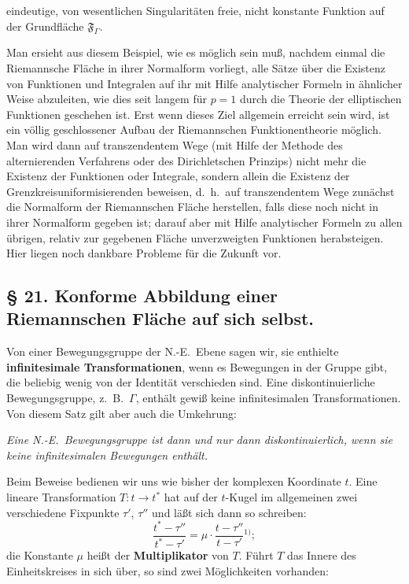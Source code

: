 \documentclass{article}
\begin{document}
eindeutige, von wesentlichen Singularitäten freie, nicht konstante Funktion auf der Grundfläche $\mathfrak{F}_\varGamma$.

Man ersieht aus diesem Beispiel, wie es möglich sein muß, nachdem einmal die Riemannsche Fläche in ihrer Normalform vorliegt, alle Sätze über die Existenz von Funktionen und Integralen auf ihr mit Hilfe analytischer Formeln in ähnlicher Weise abzuleiten, wie dies seit langem für $p = 1$ durch die Theorie der elliptischen Funktionen geschehen ist. Erst wenn dieses Ziel allgemein erreicht sein wird, ist ein völlig geschlossener Aufbau der Riemannschen Funktionentheorie möglich. Man wird dann auf transzendentem Wege (mit Hilfe der Methode des alternierenden Verfahrens oder des Dirichletschen Prinzips) nicht mehr die Existenz der Funktionen oder Integrale, sondern allein die Existenz der Grenzkreisuniformisierenden beweisen, d.~h.\ auf transzendentem Wege zunächst die Normalform der Riemannschen Fläche herstellen, falls diese noch nicht in ihrer Normalform gegeben ist; darauf aber mit Hilfe analytischer Formeln zu allen übrigen, relativ zur gegebenen Fläche unverzweigten Funktionen herabsteigen. Hier liegen noch dankbare Probleme für die Zukunft vor.

\subsection*{§ 21. Konforme Abbildung einer Riemannschen Fläche auf sich selbst.}

Von einer Bewegungsgruppe der N.-E.\ Ebene sagen wir, sie enthielte \textbf{infinitesimale Transformationen}, wenn es Bewegungen in der Gruppe gibt, die beliebig wenig von der Identität verschieden sind. Eine diskontinuierliche Bewegungsgruppe, z.~B.\ $\varGamma$, enthält gewiß keine infinitesimalen Transformationen. Von diesem Satz gilt aber auch die Umkehrung:

\emph{Eine N.-E.\ Bewegungsgruppe ist dann und nur dann diskontinuierlich, wenn sie keine infinitesimalen Bewegungen enthält.}

Beim Beweise bedienen wir uns wie bisher der komplexen Koordinate $t$. Eine lineare Transformation $T\colon t \to t^*$ hat auf der $t$-Kugel im allgemeinen zwei verschiedene Fixpunkte $\tau'$, $\tau''$ und läßt sich dann so schreiben:
\[ \frac{t^* - \tau''}{t^* - \tau'} = \mu \cdot \frac{t - \tau''}{t - \tau'}{}^{1)}; \tag{53} \]
die Konstante $\mu$ heißt der \textbf{Multiplikator} von $T$. Führt $T$ das Innere des Einheitskreises in sich über, so sind zwei Möglichkeiten vorhanden:
\end{document}
